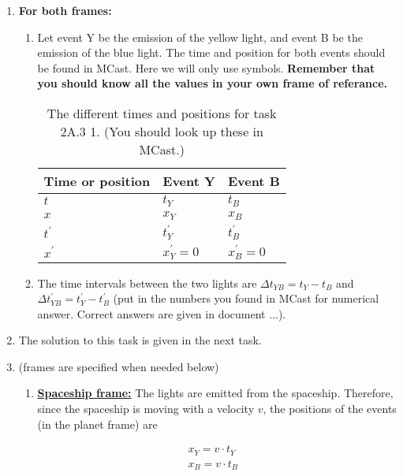 \documentclass[a4paper,10pt,english]{article}
\begin{document}
\begin{enumerate}
\item \textbf{For both frames:}

\begin{enumerate}
\item Let event Y be the emission of the yellow light, and event B be the emission of the blue light. The time and position for both events should be found in MCast. Here we will only use symbols. \textbf{Remember that you should know all the values in your own frame of referance.}

\begin{table}[H]
  \begin{center}
    \begin{tabular}{| l | l | l | }
   	\hline
	 Time or position & Event Y & Event B \\ \hline
	 $t$ & $t_Y$ & $t_B$ \\ \hline
	 $x$ & $x_Y$ & $x_B$ \\ \hline
	 $t^{\prime}$ & $t_Y^{\prime}$ & $t_B^{\prime}$ \\ \hline
	 $x^{\prime}$ & $x_Y^{\prime}=0$ & $x_B^{\prime}=0$ \\ \hline
	\end{tabular}
    \caption{The different times and positions for task 2A.3 1. (You should look up these in MCast.)}
    \label{tabel:1}
  \end{center}
\end{table}
\FloatBarrier

\item The time intervals between the two lights are $\Delta t_{YB}=t_{Y}-t_{B}$ and $\Delta t_{YB}^{\prime}=t_Y^{\prime}-t_B^{\prime}$ (put in the numbers you found in MCast for numerical answer. Correct answers are given in document $\ldots$).

\end{enumerate}

\item The solution to this task is given in the next task.
\item (frames are specified when needed below)

\begin{enumerate}
\item \underline{\bf{Spaceship frame:}} The lights are emitted from the spaceship. Therefore, since the spaceship is moving with a velocity $v$, the positions of the events (in the planet frame) are

\begin{align*}
x_Y=v\cdot t_Y&\\
x_B=v\cdot t_B
\end{align*} 


\end{enumerate}
\end{enumerate}
\end{document}

